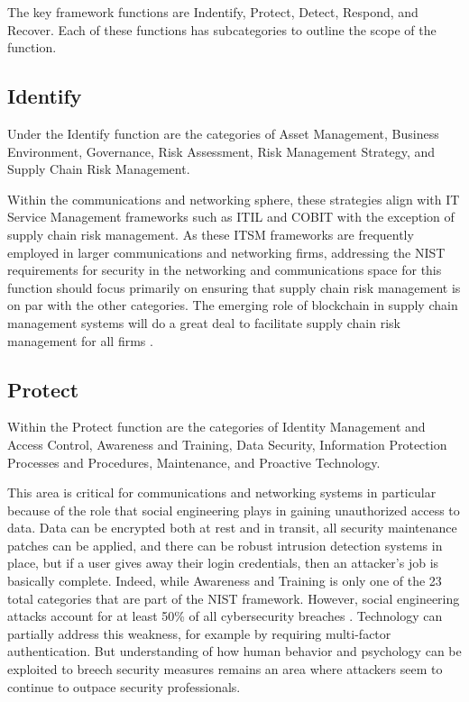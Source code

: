The key framework functions are Indentify, Protect, Detect, Respond, and Recover. Each of these functions has subcategories to outline the scope of the function.

\subsection{Identify}

Under the Identify function are the categories of Asset Management, Business Environment, Governance, Risk Assessment, Risk Management Strategy, and Supply Chain Risk Management.

Within the communications and networking sphere, these strategies align with IT Service Management frameworks such as ITIL and COBIT \parencite{deborasuryawanInformationTechnologyService2018} with the exception of supply chain risk management. As these ITSM frameworks are frequently employed in larger communications and networking firms, addressing the NIST requirements for security in the networking and communications space for this function should focus primarily on ensuring that supply chain risk management is on par with the other categories. The emerging role of blockchain in supply chain management systems will do a great deal to facilitate supply chain risk management for all firms \parencite{minBlockchainTechnologyEnhancing2019,kshetriBlockchainRolesMeeting2018}.

\subsection{Protect}

Within the Protect function are the categories of Identity Management and Access Control, Awareness and Training, Data Security, Information Protection Processes and Procedures, Maintenance, and Proactive Technology.

This area is critical for communications and networking systems in particular because of the role that social engineering plays in gaining unauthorized access to data. Data can be encrypted both at rest and in transit, all security maintenance patches can be applied, and there can be robust intrusion detection systems in place, but if a user gives away their login credentials, then an attacker's job is basically complete. Indeed, while Awareness and Training is only one of the 23 total categories that are part of the NIST framework. However, social engineering attacks account for at least 50\% of all cybersecurity breaches \parencite{jeongImprovedUnderstandingHuman2019}. Technology can partially address this weakness, for example by requiring multi-factor authentication. But understanding of how human behavior and psychology can be exploited to breech security measures remains an area where attackers seem to continue to outpace security professionals.


